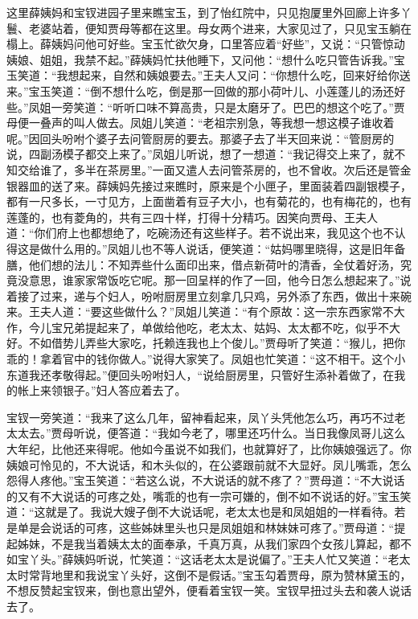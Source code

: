 \documentclass[12pt,oneside]{book}
\begin{document}
这里薛姨妈和宝钗进园子里来瞧宝玉，到了怡红院中，只见抱厦里外回廊上许多丫鬟、老婆站着，便知贾母等都在这里。母女两个进来，大家见过了，只见宝玉躺在榻上。薛姨妈问他可好些。宝玉忙欲欠身，口里答应着“好些”，又说：“只管惊动姨娘、姐姐，我禁不起。”薛姨妈忙扶他睡下，又问他：“想什么吃只管告诉我。”宝玉笑道：“我想起来，自然和姨娘要去。”王夫人又问：“你想什么吃，回来好给你送来。”宝玉笑道：“倒不想什么吃，倒是那一回做的那小荷叶儿、小莲蓬儿的汤还好些。”凤姐一旁笑道：“听听口味不算高贵，只是太磨牙了。巴巴的想这个吃了。”贾母便一叠声的叫人做去。凤姐儿笑道：“老祖宗别急，等我想一想这模子谁收着呢。”因回头吩咐个婆子去问管厨房的要去。那婆子去了半天回来说：“管厨房的说，四副汤模子都交上来了。”凤姐儿听说，想了一想道：“我记得交上来了，就不知交给谁了，多半在茶房里。”一面又遣人去问管茶房的，也不曾收。次后还是管金银器皿的送了来。薛姨妈先接过来瞧时，原来是个小匣子，里面装着四副银模子，都有一尺多长，一寸见方，上面凿着有豆子大小，也有菊花的，也有梅花的，也有莲蓬的，也有菱角的，共有三四十样，打得十分精巧。因笑向贾母、王夫人道：“你们府上也都想绝了，吃碗汤还有这些样子。若不说出来，我见这个也不认得这是做什么用的。”凤姐儿也不等人说话，便笑道：“姑妈哪里晓得，这是旧年备膳，他们想的法儿：不知弄些什么面印出来，借点新荷叶的清香，全仗着好汤，究竟没意思，谁家家常饭吃它呢。那一回呈样的作了一回，他今日怎么想起来了。”说着接了过来，递与个妇人，吩咐厨房里立刻拿几只鸡，另外添了东西，做出十来碗来。王夫人道：“要这些做什么？”凤姐儿笑道：“有个原故：这一宗东西家常不大作，今儿宝兄弟提起来了，单做给他吃，老太太、姑妈、太太都不吃，似乎不大好。不如借势儿弄些大家吃，托赖连我也上个俊儿。”贾母听了笑道：“猴儿，把你乖的！拿着官中的钱你做人。”说得大家笑了。凤姐也忙笑道：“这不相干。这个小东道我还孝敬得起。”便回头吩咐妇人，“说给厨房里，只管好生添补着做了，在我的帐上来领银子。”妇人答应着去了。

宝钗一旁笑道：“我来了这么几年，留神看起来，凤丫头凭他怎么巧，再巧不过老太太去。”贾母听说，便答道：“我如今老了，哪里还巧什么。当日我像凤哥儿这么大年纪，比他还来得呢。他如今虽说不如我们，也就算好了，比你姨娘强远了。你姨娘可怜见的，不大说话，和木头似的，在公婆跟前就不大显好。凤儿嘴乖，怎么怨得人疼他。”宝玉笑道：“若这么说，不大说话的就不疼了？”贾母道：“不大说话的又有不大说话的可疼之处，嘴乖的也有一宗可嫌的，倒不如不说话的好。”宝玉笑道：“这就是了。我说大嫂子倒不大说话呢，老太太也是和凤姐姐的一样看待。若是单是会说话的可疼，这些姊妹里头也只是凤姐姐和林妹妹可疼了。”贾母道：“提起姊妹，不是我当着姨太太的面奉承，千真万真，从我们家四个女孩儿算起，都不如宝丫头。”薛姨妈听说，忙笑道：“这话老太太是说偏了。”王夫人忙又笑道：“老太太时常背地里和我说宝丫头好，这倒不是假话。”宝玉勾着贾母，原为赞林黛玉的，不想反赞起宝钗来，倒也意出望外，便看着宝钗一笑。宝钗早扭过头去和袭人说话去了。
\end{document}
